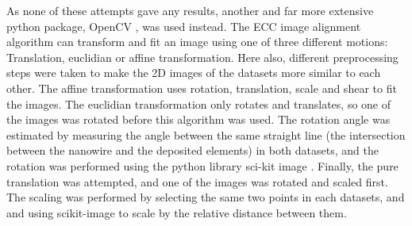 %

As none of these attempts gave any results, another and far more extensive python package, OpenCV \cite{open-cv}, was used instead. The ECC image alignment algorithm \cite{open-cv-ECC} can transform and fit an image using one of three different motions: Translation, euclidian or affine transformation. Here also, different preprocessing steps were taken to make the 2D images of the datasets more similar to each other. The affine transformation uses rotation, translation, scale and shear to fit the images. The euclidian transformation only rotates and translates, so one of the images was rotated before this algorithm was used. The rotation angle was estimated by measuring the angle between the same straight line (the intersection between the nanowire and the deposited elements) in both datasets, and the rotation was performed using the python library sci-kit image \cite{scikit-image}. Finally, the pure translation was attempted, and one of the images was rotated and scaled first. The scaling was performed by selecting the same two points in each datasets, and and using scikit-image to scale by the relative distance between them.

